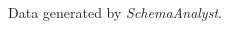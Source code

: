 \begin{frame}
\begin{columns}[T]
\begin{column}{0.5\textwidth}
{\begin{figure}
\caption{\label{fig:inserts}Data generated
by \textit{SchemaAnalyst}.}
\end{figure}
}
    \end{column}
  \end{columns}
  \end{frame}
